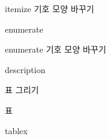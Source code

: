 \documentclass[10pt,xcolor=pdftex,dvipsnames,table,handout]{beamer}
\begin{document}
		\begin{frame}[t]{itemize 기호 모양 바꾸기}

		\end{frame}


		\begin{frame}[t]{enumerate}

		\end{frame}

		\begin{frame}[t]{enumerate 기호 모양 바꾸기}

		\end{frame}


		\begin{frame}[t]{description}

		\end{frame}





		\begin{frame}[plain]
		\end{frame}

		\begin{frame}[plain]
		\Huge{표 그리기}
		\end{frame}


		\begin{frame}[t]{표}

		\end{frame}


		\begin{frame}[t]{tablex}

		\end{frame}
\end{document}
